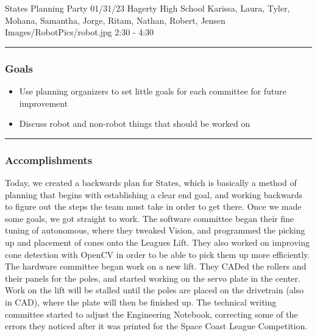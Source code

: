\insertmeeting 
	{States Planning Party} 
	{01/31/23} 
	{Hagerty High School}
	{Karissa, Laura, Tyler, Mohana, Samantha, Jorge, Ritam, Nathan, Robert, Jensen}
	{Images/RobotPics/robot.jpg}
	{2:30 - 4:30}
	
\noindent\hfil\rule{\textwidth}{.4pt}\hfil
\subsubsection*{Goals}
\begin{itemize}
    \item Use planning organizers to set little goals for each committee for future improvement
    \item Discuss robot and non-robot things that should be worked on

\end{itemize} 

\noindent\hfil\rule{\textwidth}{.4pt}\hfil

\subsubsection*{Accomplishments}
Today, we created a backwards plan for States, which is basically a method of planning that begins with establishing a clear end goal, and working backwards to figure out the steps the team must take in order to get there. Once we made some goals, we got straight to work. The software committee began their fine tuning of autonomous, where they tweaked Vision, and programmed the picking up and placement of cones onto the Leagues Lift. They also worked on improving cone detection with OpenCV in order to be able to pick them up more efficiently. The hardware committee began work on a new lift. They CADed the rollers and their panels for the poles, and started working on the servo plate in the center. Work on the lift will be stalled until the poles are placed on the drivetrain (also in CAD), where the plate will then be finished up. The technical writing committee started to adjust the Engineering Notebook, correcting some of the errors they noticed after it was printed for the Space Coast League Competition.



